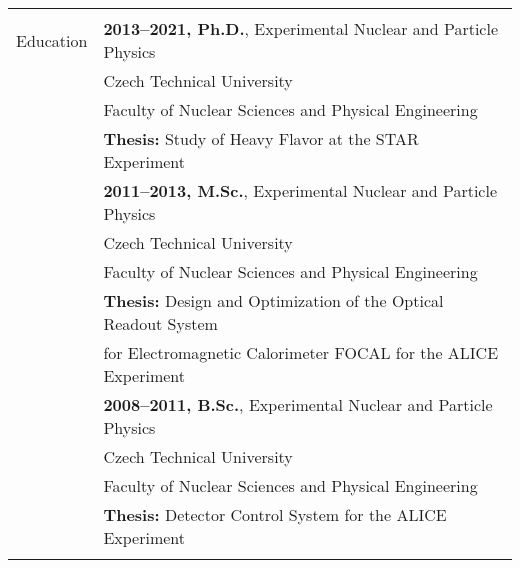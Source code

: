 \documentclass[a4paper,11pt,oneside]{article}
\begin{document}
\noindent \begin{tabular}{@{} l l}
\hline \\
 \Large{Education}   
     & \textbf{2013--2021, Ph.D.}, Experimental Nuclear and Particle Physics \\
     & {Czech Technical University} \\
     & {Faculty of Nuclear Sciences and Physical Engineering} \\
     & \textbf{Thesis:} Study of Heavy Flavor at the STAR Experiment \\[.3cm]
     & \textbf{2011--2013, M.Sc.}, Experimental Nuclear and Particle Physics \\
     & {Czech Technical University} \\
     & {Faculty of Nuclear Sciences and Physical Engineering} \\
     & \textbf{Thesis:} Design and Optimization of the Optical Readout System \\
     & for Electromagnetic Calorimeter FOCAL for the ALICE Experiment \\[.3cm]
     & \textbf{2008--2011, B.Sc.}, Experimental Nuclear and Particle Physics \\
     & {Czech Technical University} \\
     & {Faculty of Nuclear Sciences and Physical Engineering} \\
     & \textbf{Thesis:} Detector Control System for the ALICE Experiment \\
     \\
   

\end{tabular}
\end{document}
